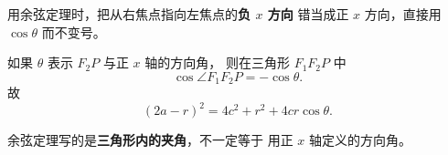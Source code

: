 \begin{trapbox}
    \medskip

    \begin{description}[style=nextline,leftmargin=2.8em,labelsep=0.5em,itemsep=0.35em]
        \item[\textbf{\textcolor{CTrap}{易错点六（余弦定理夹角符号误判）}}]
              用余弦定理时，把从右焦点指向左焦点的\textbf{负 $x$ 方向}
              错当成正 $x$ 方向，直接用 $\cos\theta$ 而不变号。
        \item[\textbf{\textcolor{CTrap}{正确理解（方向角差 $\pi$）}}]
              如果 $\theta$ 表示 $F_2P$ 与正 $x$ 轴的方向角，
              则在三角形 $F_1F_2P$ 中
              \[
                  \cos\angle F_1F_2P=-\cos\theta.
              \]
              故
              \[
                  (2a-r)^2=4c^2+r^2+4cr\cos\theta.
              \]
        \item[\textbf{\textcolor{CTrap}{错因分析}}]
              余弦定理写的是\textbf{三角形内的夹角}，不一定等于
              用正 $x$ 轴定义的方向角。
    \end{description}

\end{trapbox}